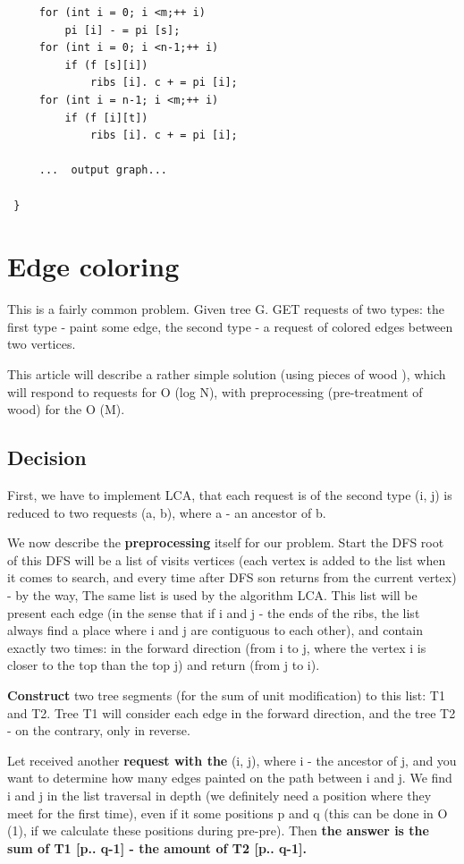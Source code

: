 \begin{verbatim}
     for (int i = 0; i <m;++ i)
         pi [i] - = pi [s];
     for (int i = 0; i <n-1;++ i)
         if (f [s][i])
             ribs [i]. c + = pi [i];
     for (int i = n-1; i <m;++ i)
         if (f [i][t])
             ribs [i]. c + = pi [i];

     ...  output graph...
    
 } 
\end{verbatim}
\section{ Edge coloring }
This is a fairly common problem. Given tree G. GET requests of two types: the first type - paint some edge, the second type - a request of colored edges between two vertices.

This article will describe a rather simple solution (using pieces of wood ), which will respond to requests for O (log N), with preprocessing (pre-treatment of wood) for the O (M).

\subsection{ Decision }
First, we have to implement LCA, that each request is of the second type (i, j) is reduced to two requests (a, b), where a - an ancestor of b.

We now describe the \textbf{preprocessing} itself for our problem. Start the DFS root of this DFS will be a list of visits vertices (each vertex is added to the list when it comes to search, and every time after DFS son returns from the current vertex) - by the way, The same list is used by the algorithm LCA. This list will be present each edge (in the sense that if i and j - the ends of the ribs, the list always find a place where i and j are contiguous to each other), and contain exactly two times: in the forward direction (from i to j, where the vertex i is closer to the top than the top j) and return (from j to i).

\textbf{Construct} two tree segments (for the sum of unit modification) to this list: T1 and T2. Tree T1 will consider each edge in the forward direction, and the tree T2 - on the contrary, only in reverse.

Let received another \textbf{request with the} (i, j), where i - the ancestor of j, and you want to determine how many edges painted on the path between i and j. We find i and j in the list traversal in depth (we definitely need a position where they meet for the first time), even if it some positions p and q (this can be done in O (1), if we calculate these positions during pre-pre). Then \textbf{the answer is the sum of T1 [p.. q-1] - the amount of T2 [p.. q-1].}

